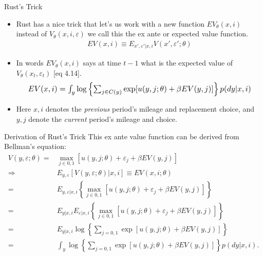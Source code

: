 \documentclass[xcolor=pdftex,dvipsnames,table,mathserif]{beamer}
\begin{document}
\begin{frame}{Rust's Trick}\

\begin{itemize}
\item Rust has a nice trick that let's us work with a new function $EV_{\theta}(x,i)$ instead of $V_{\theta}(x,i,\varepsilon)$ we call this the \alert{ex ante} or \alert{expected value function}.
\begin{eqnarray*}
EV(x, i) \equiv E_{x', \varepsilon ' | x, i} V(x', \varepsilon ' ; \theta)
\end{eqnarray*}
\item In words $EV_{\theta}(x,i)$ says at time $t-1$ what is the expected value of $V_{\theta}(x_t,\varepsilon_t)$ [eq 4.14].
\begin{eqnarray*}
\resizebox{.9\hsize}{!}{$EV(x,i) = \int_y \log \left \{ \sum_{j \in C(y)} \exp [ u(y,j; \theta) + \beta EV(y, j)] \right \} p(dy|x,i) $}
\end{eqnarray*}
\item Here $x, i$ denotes the \emph{previous} period's mileage and replacement choice, and $y, j$ denote the \emph{current} period's mileage and choice. 
\end{itemize}
\end{frame}

\begin{frame}{Derivation of Rust's Trick}
This \alert{ex ante value function} can be derived from Bellman's equation:
\begin{equation*}
\begin{split}
V(y, \varepsilon ;\theta) = & \max_{j \in 0,1} [ u(y, j ; \theta) + \varepsilon_j + \beta EV(y,j)] \\
\Longrightarrow & E_{y, \varepsilon} [V(y, \varepsilon ; \theta) | x, i ] \equiv  EV(x, i ; \theta) \\
= & E_{y, \varepsilon | x, i } \left \{ \max_{ j \in 0,1} [ u(y, j ; \theta) + \varepsilon_j + \beta EV(y,j)] \right \} \\
= &  E_{y | x, i }  E_{\varepsilon | x, i } \left \{ \max_{ j \in 0,1} [ u(y, j ; \theta) + \varepsilon_j + \beta EV(y,j)] \right \} \\
= &  E_{y | x, i } \log \left \{ \sum_{j=0,1} \exp [ u(y, j ; \theta)  + \beta EV(y,j)] \right \} \\
= & \int_y \log  \left \{ \sum_{j=0,1} \exp [ u(y, j ; \theta)  + \beta EV(y,j)] \right \} p(dy|x,i).
\end{split}
\end{equation*}
\end{frame}
%
\end{document}
